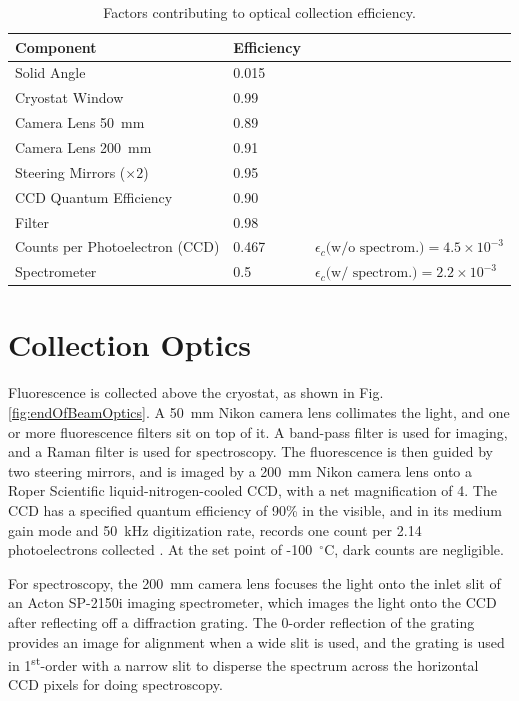 

\begin{table} [!htbp]
\caption{Factors contributing to optical collection efficiency.}
\label{table:colleff}
\begin{tabular}{l l l}
Component & Efficiency & \\
\hline
Solid Angle & 0.015 & \\
Cryostat Window & 0.99 & \\
Camera Lens 50~mm & 0.89 & \\
Camera Lens 200~mm & 0.91 & \\
Steering Mirrors ($\times 2$) & 0.95 & \\
CCD Quantum Efficiency & 0.90 & \\
Filter & 0.98 & \\
Counts per Photoelectron (CCD) & 0.467 & $\epsilon_{c}\text{(w/o spectrom.)} = 4.5 \times 10^{-3}$\\
\hline
Spectrometer & 0.5 & $\epsilon_{c}\text{(w/ spectrom.)} = 2.2 \times 10^{-3}$\\
\end{tabular}
\end{table}

\section{Collection Optics}
\label{sec:collection}

Fluorescence is collected above the cryostat, as shown in Fig. \ref{fig:endOfBeamOptics}.  A 50~mm Nikon camera lens collimates the light, and one or more fluorescence filters sit on top of it.  A band-pass filter is used for imaging, and a Raman filter is used for spectroscopy.  The fluorescence is then guided by two steering mirrors, and is imaged by a 200~mm Nikon camera lens onto a Roper Scientific liquid-nitrogen-cooled CCD, with a net magnification of 4.  The CCD has a specified quantum efficiency of 90\% in the visible, and in its medium gain mode and 50~kHz digitization rate, records one count per 2.14 photoelectrons collected \cite{PrincetonInstruments}.  At the set point of -100~$^{\circ}$C, dark counts are negligible.

For spectroscopy, the 200~mm camera lens focuses the light onto the inlet slit of an Acton SP-2150i imaging spectrometer, which images the light onto the CCD after reflecting off a diffraction grating.  The 0-order reflection of the grating provides an image for alignment when a wide slit is used, and the grating is used in 1\textsuperscript{st}-order with a narrow slit to disperse the spectrum across the horizontal CCD pixels for doing spectroscopy.

